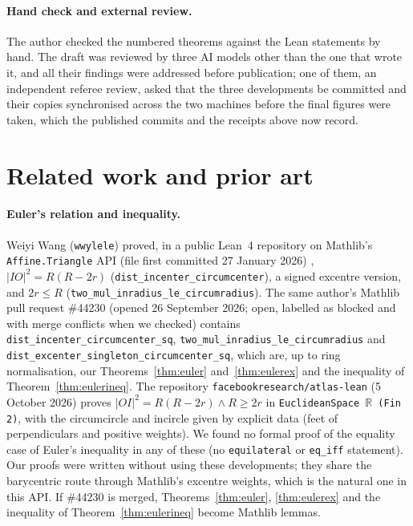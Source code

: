 \documentclass[11pt]{article}
\theoremstyle{definition}
\theoremstyle{remark}
\newcommand{\lean}[1]{\texttt{#1}}
\begin{document}
\paragraph{Hand check and external review.} The author checked the numbered theorems against the
Lean statements by hand. The draft was reviewed by three AI models other than the one that wrote it,
and all their findings were addressed before publication; one of them, an independent referee
review, asked that the three developments be committed and their copies synchronised across the two
machines before the final figures were taken, which the published commits and the receipts above
now record.
\section{Related work and prior art}\label{sec:related}
\paragraph{Euler's relation and inequality.} Weiyi Wang (\lean{wwylele}) proved, in a public Lean~4
repository on Mathlib's \lean{Affine.Triangle} API (file first committed 27 January 2026)
\cite{wwylele}, $|IO|^2=R(R-2r)$ (\lean{dist\_incenter\_circumcenter}), a signed excentre version,
and $2r\le R$ (\lean{two\_mul\_inradius\_le\_circumradius}). The same author's Mathlib pull request
\#44230 \cite{pr44230} (opened 26 September 2026; open, labelled as blocked and with merge conflicts
when we checked) contains \lean{dist\_incenter\_circumcenter\_sq},
\lean{two\_mul\_inradius\_le\_circumradius} and
\lean{dist\_excenter\_singleton\_circumcenter\_sq}, which are, up to ring normalisation, our
Theorems~\ref{thm:euler} and~\ref{thm:eulerex} and the inequality of Theorem~\ref{thm:eulerineq}.
The repository \lean{facebookresearch/atlas-lean} \cite{atlaseuler} (5 October 2026) proves
$|OI|^2=R(R-2r)\wedge R\ge2r$ in \lean{EuclideanSpace \(\mathbb{R}\) (Fin 2)}, with the circumcircle
and incircle given by explicit data (feet of perpendiculars and positive weights). We found no
formal proof of the equality case of Euler's inequality in any of these (no \lean{equilateral} or
\lean{eq\_iff} statement). Our proofs were written without using these developments; they share the
barycentric route through Mathlib's excentre weights, which is the natural one in this API. If
\#44230 is merged, Theorems~\ref{thm:euler}, \ref{thm:eulerex} and the inequality of
Theorem~\ref{thm:eulerineq} become Mathlib lemmas.
\end{document}

